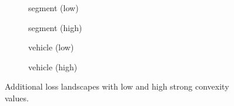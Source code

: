 \begin{figure}[b]
\begin{subfigure}{.24\textwidth}
        
        \caption{segment (low)}
    \end{subfigure}
    \begin{subfigure}{.24\textwidth}
        
        \caption{segment (high)}
    \end{subfigure}
    \begin{subfigure}{.24\textwidth}
        
        \caption{vehicle (low)}
    \end{subfigure}
    \begin{subfigure}{.24\textwidth}
        
        \caption{vehicle (high)}
    \end{subfigure}
    \caption{Additional loss landscapes with low and high strong convexity values.}
    \label{fig:landscapes-all}
\end{figure}
